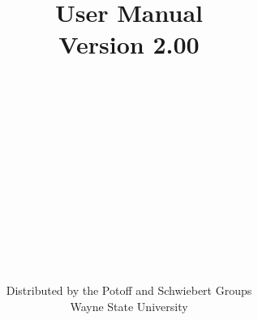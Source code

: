\posttitle{\end{center}}
\setlength{\parindent}{0cm}



\title{\Huge User Manual\\Version 2.00}
\author{\\\\\\\\\\\\\\\\\\\\\\\\\\Distributed by the Potoff and Schwiebert Groups\\\textcopyright Wayne State University}

\maketitle
\thispagestyle{empty}
\newpage

\tableofcontents
\newpage

